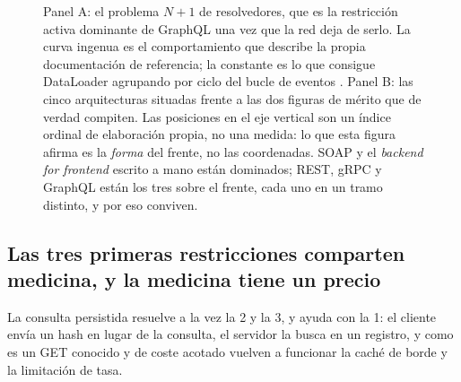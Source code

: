 \documentclass[11pt,letterpaper]{article}
\newcommand{\fx}[1]{(#1)*0.062}
\newcommand{\fy}[1]{(#1)*0.045}
\newcommand{\punto}[5]{%
  \fill[#3] ({\fx{#1}},{\fy{#2}}) circle (2.6pt);%
  \node[#5, font=\scriptsize, text=#3, inner sep=2.8pt, align=center]
       at ({\fx{#1}},{\fy{#2}}) {#4};%
}
\begin{document}
\begin{figure}[!htb]
\caption{Panel A: el problema $N+1$ de resolvedores, que es la restricción
activa dominante de GraphQL una vez que la red deja de serlo. La curva ingenua
es el comportamiento que describe la propia documentación de referencia; la
constante es lo que consigue DataLoader agrupando por ciclo del bucle de
eventos \parencite{dataloader}. Panel B: las cinco arquitecturas situadas
frente a las dos figuras de mérito que de verdad compiten. Las posiciones en el
eje vertical son un índice ordinal de elaboración propia, no una medida: lo que
esta figura afirma es la \emph{forma} del frente, no las coordenadas. SOAP y el
\emph{backend for frontend} escrito a mano están dominados; REST, gRPC y
GraphQL están los tres sobre el frente, cada uno en un tramo distinto, y por
eso conviven.}
\label{fig:restricciones}
\end{figure}

\subsection*{Las tres primeras restricciones comparten medicina, y la medicina
tiene un precio}

La consulta persistida resuelve a la vez la 2 y la 3, y ayuda con la 1: el
cliente envía un hash en lugar de la consulta, el servidor la busca en un
registro, y como es un GET conocido y de coste acotado vuelven a funcionar la
caché de borde y la limitación de tasa.
\end{document}
